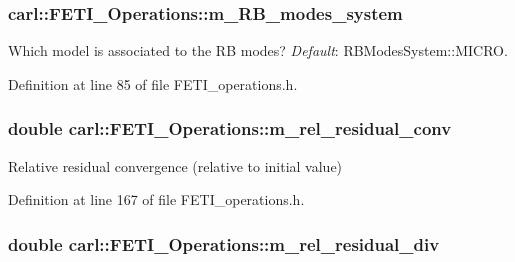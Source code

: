 \subsubsection[{m\+\_\+\+R\+B\+\_\+modes\+\_\+system}]{ carl\+::\+F\+E\+T\+I\+\_\+\+Operations\+::m\+\_\+\+R\+B\+\_\+modes\+\_\+system\hspace{0.3cm}{\ttfamily [protected]}}\label{classcarl_1_1_f_e_t_i___operations_a1ca335075ea08144dd5756ad5969cb08}


Which model is associated to the R\+B modes? {\itshape Default}\+: {\ttfamily R\+B\+Modes\+System\+::\+M\+I\+C\+R\+O}. 



Definition at line 85 of file F\+E\+T\+I\+\_\+operations.\+h.

\hypertarget{classcarl_1_1_f_e_t_i___operations_a4d1bd14942397cc0cf91c4625f7482da}{}
\subsubsection[{m\+\_\+rel\+\_\+residual\+\_\+conv}]{\setlength{\rightskip}{0pt plus 5cm}double carl\+::\+F\+E\+T\+I\+\_\+\+Operations\+::m\+\_\+rel\+\_\+residual\+\_\+conv\hspace{0.3cm}{\ttfamily [protected]}}\label{classcarl_1_1_f_e_t_i___operations_a4d1bd14942397cc0cf91c4625f7482da}


Relative residual convergence (relative to initial value) 



Definition at line 167 of file F\+E\+T\+I\+\_\+operations.\+h.

\hypertarget{classcarl_1_1_f_e_t_i___operations_ae5050693b56d9bc3a3794014485fcf04}{}
\subsubsection[{m\+\_\+rel\+\_\+residual\+\_\+div}]{\setlength{\rightskip}{0pt plus 5cm}double carl\+::\+F\+E\+T\+I\+\_\+\+Operations\+::m\+\_\+rel\+\_\+residual\+\_\+div\hspace{0.3cm}{\ttfamily [protected]}}\label{classcarl_1_1_f_e_t_i___operations_ae5050693b56d9bc3a3794014485fcf04}


